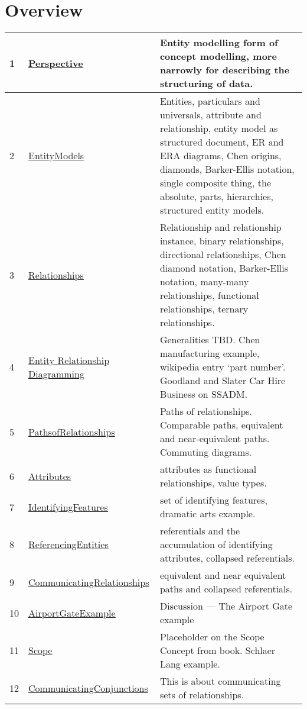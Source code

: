 
\newcommand{\mysection}[1]{\underline{\hyperref[#1]{#1}}}
\section*{Overview}
\label{Overview}
\begin{tabular}{l l p{7cm}}
1 & \mysection{Perspective} & Entity modelling form of concept modelling, more narrowly for describing the structuring of data.\\
\hline
2 & \mysection{EntityModels} & Entities, particulars and universals, attribute and relationship, entity model as structured document, ER and ERA diagrams, Chen origins, diamonds, Barker-Ellis notation, single composite thing, the absolute, parts, hierarchies, structured entity models.\\
\hline
3 & \mysection{Relationships} & Relationship and relationship instance, binary relationships, directional relationships, Chen diamond notation, Barker-Ellis notation, many-many relationships, functional relationships, ternary relationships. \\
\hline
4 & \mysection{Entity Relationship Diagramming} & Generalities TBD. Chen manufacturing example, wikipedia entry `part number'.
                                     Goodland and Slater Car Hire Business on SSADM.\\
\hline
5 & \mysection{PathsofRelationships} & Paths of relationships. Comparable paths, equivalent and near-equivalent paths. Commuting diagrams.\\
\hline
6 & \mysection{Attributes} & attributes as functional relationships, value types.
\\
\hline
7 & \mysection{IdentifyingFeatures} &  set of identifying features, dramatic arts example.\\
\hline
8 & \mysection{ReferencingEntities} &  referentials and the accumulation of identifying attributes, collapsed referentials.\\
\hline
9 & \mysection{CommunicatingRelationships} & equivalent and near equivalent paths and collapsed referentials. \\
\hline
10 & \mysection{AirportGateExample} &  Discussion --- The Airport Gate example\\
\hline
11 & \mysection{Scope} & Placeholder on the Scope Concept from book.   Schlaer Lang example. \\
\hline
12 & \mysection{CommunicatingConjunctions} & This is about communicating sets of relationships. 

\end{tabular}
